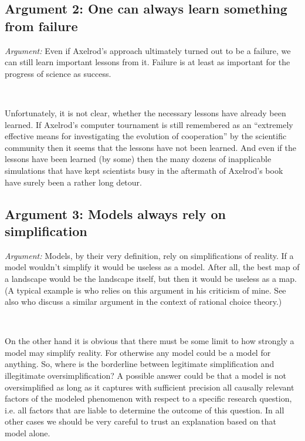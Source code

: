\documentclass[graybox, English]{svmult}
\begin{document}
\subsection{Argument 2: One can always learn something from failure}

{\em Argument:} Even if Axelrod's approach ultimately turned out to be
a failure, we can still learn important lessons from it. Failure is at
least as important for the progress of science as success.

\

 Unfortunately, it is not clear, whether the necessary
lessons have already been learned. If Axelrod's computer tournament is
still remembered as an ``extremely effective means for investigating
the evolution of cooperation'' \citep[208]{rendell-et-al:2010a} by the
scientific community then it seems that the lessons have not been
learned. And even if the lessons have been learned (by some) then the
many dozens of inapplicable simulations that have kept scientists busy
in the aftermath of Axelrod's book have surely been a rather long
detour.

\subsection{Argument 3: Models always rely on simplification}

{\em Argument:} Models, by their very definition, rely on
simplifications of reality. If a model wouldn't simplify it would be
useless as a model. After all, the best map of a landscape would be
the landscape itself, but then it would be useless as a map. (A
typical example is \citet{zollman:2009} who relies on this argument
in his criticism of mine. See also \citet[191]{green-shapiro:1994} who
discuss a similar argument in the context of rational choice theory.)

\

 On the other hand it is obvious that there must be
some limit to how strongly a model may simplify reality. For otherwise
any model could be a model for anything. So, where is the borderline
between legitimate simplification and illegitimate oversimplification?
A possible answer could be that a model is not oversimplified as long
as it captures with sufficient precision all causally relevant factors
of the modeled phenomenon with respect to a specific research
question, i.e. all factors that are liable to determine the outcome of
this question. In all other cases we should be very careful to trust
an explanation based on that model alone. 
\end{document}
